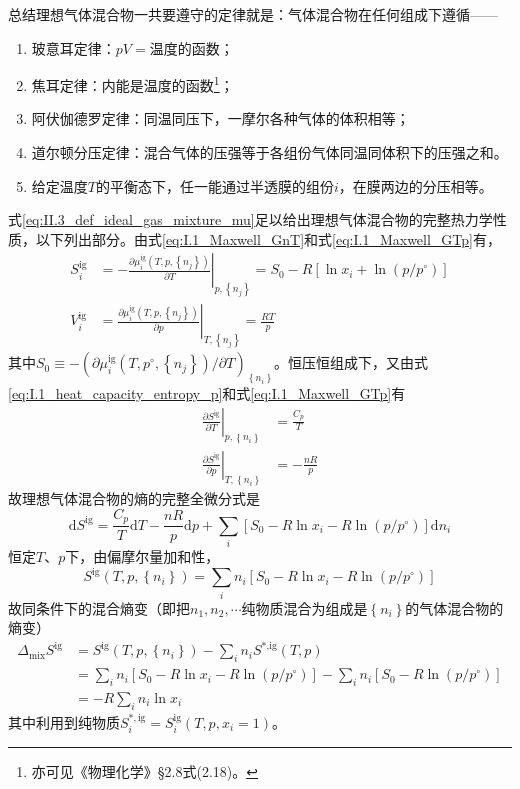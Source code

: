 \documentclass[main.tex]{subfiles}
\begin{document}
总结理想气体混合物一共要遵守的定律就是：气体混合物在任何组成下遵循——
\begin{enumerate}
    \item 玻意耳定律：$pV=\text{温度的函数}$；
    \item 焦耳定律：内能是温度的函数\footnote{亦可见《物理化学》\S 2.8式(2.18)。}；
    \item 阿伏伽德罗定律：同温同压下，一摩尔各种气体的体积相等；
    \item 道尔顿分压定律：混合气体的压强等于各组份气体同温同体积下的压强之和。
    \item 给定温度$T$的平衡态下，任一能通过半透膜的组份$i$，在膜两边的分压相等。
\end{enumerate}

式\eqref{eq:II.3_def_ideal_gas_mixture_mu}足以给出理想气体混合物的完整热力学性质，以下列出部分。由式\eqref{eq:I.1_Maxwell_GnT}和式\eqref{eq:I.1_Maxwell_GTp}有，
\begin{align}
    S^\text{ig}_i & =-\left.\frac{\partial \mu^\text{ig}_i\left(T,p,\left\{n_j\right\}\right)}{\partial T}\right|_{p,\left\{n_j\right\}}=S_0-R\left[\ln x_i+\ln \left(p/p^\circ\right)\right] \\
    V^\text{ig}_i & =\left.\frac{\partial\mu^\text{ig}_i\left(T,p,\left\{n_j\right\}\right)}{\partial p}\right|_{T,\left\{n_j\right\}}=\frac{RT}{p}
\end{align}
其中$S_0\equiv-\left(\partial\mu_i^\text{ig}\left(T,p^\circ,\left\{n_j\right\}\right)/\partial T\right)_{\left\{n_i\right\}}$。恒压恒组成下，又由式\eqref{eq:I.1_heat_capacity_entropy_p}和式\eqref{eq:I.1_Maxwell_GTp}有
\begin{align}
    \left.\frac{\partial S^\text{ig}}{\partial T}\right|_{p,\left\{n_i\right\}} & =\frac{C_p}{T} \\
    \left.\frac{\partial S^\text{ig}}{\partial p}\right|_{T,\left\{n_i\right\}} & =-\frac{nR}{p}
\end{align}
故理想气体混合物的熵的完整全微分式是
\[\mathrm{d}S^\text{ig}=\frac{C_p}{T}\mathrm{d}T-\frac{nR}{p}\mathrm{d}p+\sum_i\left[S_0-R\ln x_i-R\ln\left(p/p^\circ\right)\right]\mathrm{d}n_i\]
恒定$T$、$p$下，由偏摩尔量加和性，
\[S^\text{ig}\left(T,p,\left\{n_i\right\}\right)=\sum_in_i\left[S_0-R\ln x_i-R\ln\left(p/ p^\circ\right)\right]\]
故同条件下的混合熵变（即把$n_1,n_2,\cdots$纯物质混合为组成是$\left\{n_i\right\}$的气体混合物的熵变）
\begin{align*}
    \Delta_\text{mix}S^\text{ig} & =S^\text{ig}\left(T,p,\left\{n_i\right\}\right)-\sum_i n_i S^\text{*,ig}\left(T,p\right)                            \\
                                 & =\sum_in_i\left[S_0-R\ln x_i-R\ln\left(p/p^\circ\right)\right]-\sum_in_i\left[S_0-R\ln\left(p/p^\circ\right)\right] \\
                                 & =-R\sum_in_i\ln x_i
\end{align*}
其中利用到纯物质$S_i^{*,\text{ig}}=S_i^\text{ig}\left(T,p,x_i=1\right)$。
\end{document}
